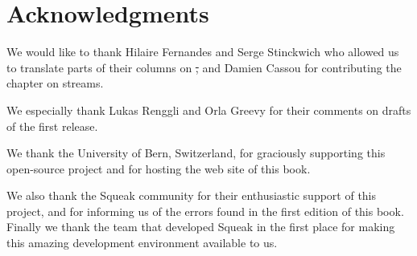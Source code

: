 \documentclass[a4paper,10pt,twoside]{book}
\begin{document}







\section*{Acknowledgments}

We would like to thank Hilaire Fernandes and Serge Stinckwich who allowed us to translate parts of their columns on \st, and Damien Cassou for contributing the chapter on streams.

We especially thank Lukas Renggli and Orla Greevy for their comments on drafts of the first release.

We thank the University of Bern, Switzerland, for graciously supporting this open-source project and for hosting the web site of this book.

We also thank the Squeak community for their enthusiastic support of this project, and for informing us of the errors found in the first edition of this book.
Finally we thank the team that developed Squeak in the first place for making this amazing development environment available to us.



\ifx\wholebook\relax\else
   
   
\end{document}
